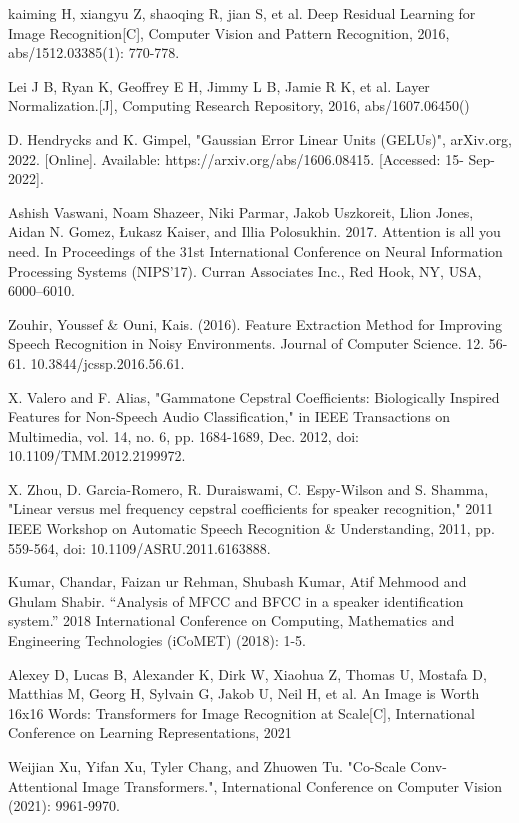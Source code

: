 \documentclass[runningheads]{llncs}
\begin{document}
\begin{thebibliography}{8}
\bibitem{} kaiming H, xiangyu Z, shaoqing R, jian S, et al. Deep Residual Learning for Image Recognition[C], Computer Vision and Pattern Recognition, 2016, abs/1512.03385(1): 770-778.

\bibitem{} Lei J B, Ryan K, Geoffrey E H, Jimmy L B, Jamie R K, et al. Layer Normalization.[J], Computing Research Repository, 2016, abs/1607.06450()

\bibitem{} D. Hendrycks and K. Gimpel, "Gaussian Error Linear Units (GELUs)", arXiv.org, 2022. [Online]. Available: https://arxiv.org/abs/1606.08415. [Accessed: 15- Sep- 2022].

\bibitem{}Ashish Vaswani, Noam Shazeer, Niki Parmar, Jakob Uszkoreit, Llion Jones, Aidan N. Gomez, Łukasz Kaiser, and Illia Polosukhin. 2017. Attention is all you need. In Proceedings of the 31st International Conference on Neural Information Processing Systems (NIPS'17). Curran Associates Inc., Red Hook, NY, USA, 6000–6010.


\bibitem{} Zouhir, Youssef \& Ouni, Kais. (2016). Feature Extraction Method for Improving Speech Recognition in Noisy Environments. Journal of Computer Science. 12. 56-61. 10.3844/jcssp.2016.56.61.

\bibitem{} X. Valero and F. Alias, "Gammatone Cepstral Coefficients: Biologically Inspired Features for Non-Speech Audio Classification," in IEEE Transactions on Multimedia, vol. 14, no. 6, pp. 1684-1689, Dec. 2012, doi: 10.1109/TMM.2012.2199972.

\bibitem{}X. Zhou, D. Garcia-Romero, R. Duraiswami, C. Espy-Wilson and S. Shamma, "Linear versus mel frequency cepstral coefficients for speaker recognition," 2011 IEEE Workshop on Automatic Speech Recognition \& Understanding, 2011, pp. 559-564, doi: 10.1109/ASRU.2011.6163888.

\bibitem{} Kumar, Chandar, Faizan ur Rehman, Shubash Kumar, Atif Mehmood and Ghulam Shabir. “Analysis of MFCC and BFCC in a speaker identification system.” 2018 International Conference on Computing, Mathematics and Engineering Technologies (iCoMET) (2018): 1-5.

\bibitem{} Alexey D, Lucas B, Alexander K, Dirk W, Xiaohua Z, Thomas U, Mostafa D, Matthias M, Georg H, Sylvain G, Jakob U, Neil H, et al. An Image is Worth 16x16 Words: Transformers for Image Recognition at Scale[C], International Conference on Learning Representations, 2021

\bibitem{} Weijian Xu, Yifan Xu, Tyler Chang, and Zhuowen Tu. "Co-Scale Conv-Attentional Image Transformers.", International Conference on Computer Vision (2021): 9961-9970.


\end{thebibliography}
\end{document}
